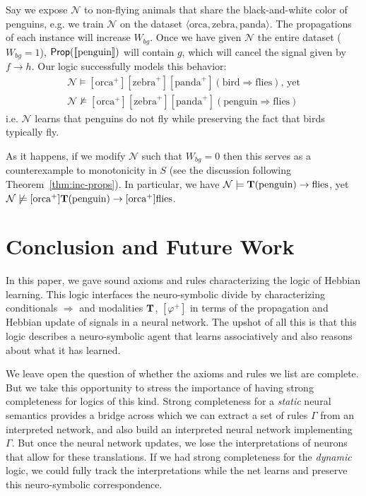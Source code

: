 \documentclass[letterpaper]{article}
\theoremstyle{definition}
\newcommand{\semantics}[1]{[\![\mbox{\em $ #1 $\/}]\!]}
\newcommand{\Typ}{\textrm{\textup{\textbf{T}}}}
\newcommand{\Prop}{\textsf{Prop}}
\newcommand{\Net}{\mathcal{N}}
\begin{document}
Say we expose $\Net$ to non-flying animals that share the black-and-white color of penguins, e.g. we train $\Net$ on the dataset $\langle \textrm{orca}, \textrm{zebra}, \textrm{panda} \rangle$.  The propagations of each instance will increase $W_{bg}$.  Once we have given $\Net$ the entire dataset ($W_{bg} = 1$), $\Prop(\semantics{\textup{penguin}})$ will contain $g$, which will cancel the signal given by ${f \to h}$.  Our logic successfully models this behavior:
\[
\begin{array}{l}
\Net \models [\textrm{orca}^+] [\textrm{zebra}^+] [\textrm{panda}^+] (\textrm{bird} \Rightarrow \textrm{flies}) \textrm{, yet}\\
\Net \not \models [\textrm{orca}^+] [\textrm{zebra}^+] [\textrm{panda}^+] (\textrm{penguin} \Rightarrow \textrm{flies})
\end{array}
\]
i.e. $\Net$ learns that penguins do not fly while preserving the fact that birds typically fly. 

As it happens, if we modify $\Net$ such that $W_{bg} = 0$ then this serves as a counterexample to monotonicity in $S$ (see the discussion following Theorem~\ref{thm:inc-props}).  In particular, we have $\Net \models \Typ(\textrm{penguin}) \to \textrm{flies}$, yet $\Net \not \models [\textrm{orca}^+] \Typ(\textrm{penguin}) \to [\textrm{orca}^+] \textrm{flies}$. 

\section{Conclusion and Future Work}

In this paper, we gave sound axioms and rules characterizing the logic of Hebbian learning.  This logic interfaces the neuro-symbolic divide by characterizing conditionals $\Rightarrow$ and modalities $\Typ$, $[\varphi^+]$ in terms of the propagation and Hebbian update of signals in a neural network.  The upshot of all this is that this logic describes a neuro-symbolic agent that learns associatively and also reasons about what it has learned.

We leave open the question of whether the axioms and rules we list are complete.  But we take this opportunity to stress the importance of having strong completeness for logics of this kind.  Strong completeness for a \emph{static} neural semantics provides a bridge across which we can extract a set of rules $\Gamma$ from an interpreted network, and also build an interpreted neural network implementing $\Gamma$.  But once the neural network updates, we lose the interpretations of neurons that allow for these translations.  If we had strong completeness for the \emph{dynamic} logic, we could fully track the interpretations while the net learns and preserve this neuro-symbolic correspondence.
\end{document}
